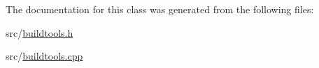 The documentation for this class was generated from the following files\-:\begin{DoxyCompactItemize}
\item 
src/\hyperlink{buildtools_8h}{buildtools.\-h}\item 
src/\hyperlink{buildtools_8cpp}{buildtools.\-cpp}\end{DoxyCompactItemize}
